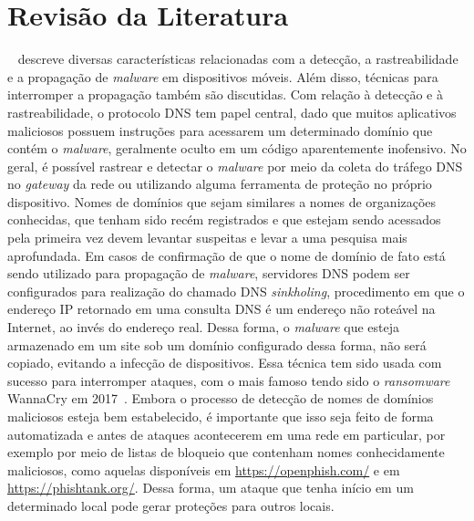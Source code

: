 \chapter{Revisão da Literatura}
\label{cap:revisao-literatura}

~\citet{survey1} descreve diversas características relacionadas com a detecção, a rastreabilidade e a propagação de \textit{malware} em dispositivos móveis. Além disso, técnicas para interromper a propagação também são discutidas. Com relação à detecção e à rastreabilidade, o protocolo DNS tem papel central, dado que muitos aplicativos maliciosos possuem instruções para acessarem um determinado domínio que contém o \textit{malware}, geralmente oculto em um código aparentemente inofensivo. No geral, é possível rastrear e detectar o \textit{malware} por meio da coleta do tráfego DNS no \textit{gateway} da rede ou utilizando alguma ferramenta de proteção no próprio dispositivo. Nomes de domínios que sejam similares a nomes de organizações conhecidas, que tenham sido recém registrados e que estejam sendo acessados pela primeira vez devem levantar suspeitas e levar a uma pesquisa mais aprofundada. Em casos de confirmação de que o nome de domínio de fato está sendo utilizado para propagação de \textit{malware}, servidores DNS podem ser configurados para realização do chamado DNS \textit{sinkholing}, procedimento em que o endereço IP retornado em uma consulta DNS é um endereço não roteável na Internet, ao invés do endereço real. Dessa forma, o \textit{malware} que esteja armazenado em um site sob um domínio configurado dessa forma, não será copiado, evitando a infecção de dispositivos. Essa técnica tem sido usada com sucesso para interromper ataques, com o mais famoso tendo sido o \textit{ransomware} WannaCry em 2017~\citep{wannacry}. Embora o processo de detecção de nomes de domínios maliciosos esteja bem estabelecido, é importante que isso seja feito de forma automatizada e antes de ataques acontecerem em uma rede em particular, por exemplo por meio de listas de bloqueio que contenham nomes conhecidamente maliciosos, como aquelas disponíveis em \url{https://openphish.com/} e em \url{https://phishtank.org/}. Dessa forma, um ataque que tenha início em um determinado local pode gerar proteções para outros locais.

